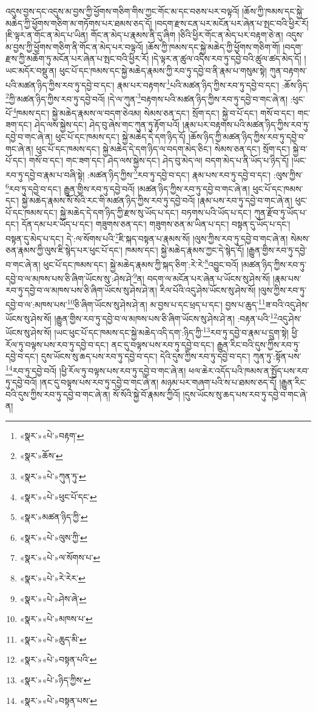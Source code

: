 འདུས་བྱས་དང་འདུས་མ་བྱས་ཀྱི་ཕྱོགས་གཅིག་གིས་ཀྱང་གོང་མ་དང་བཅས་པར་བལྟའོ། །ཆོས་ཀྱི་ཁམས་དང་སྐྱེ་མཆེད་ཀྱི་ཕྱོགས་གཅིག་མ་གཏོགས་པར་ཐམས་ཅད་དོ། །བདག་རྫས་ངན་པར་མངོན་པར་ཞེན་པ་སྤང་བའི་ཕྱིར་རོ། །ཇི་ལྟར་ན་གོང་ན་མེད་པ་ཡིན། གོང་ན་མེད་པ་རྣམས་ནི་དུ་ཞིག །ཅིའི་ཕྱིར་གོང་ན་མེད་པར་བརྟག་ཅེ་ན། འདུས་མ་བྱས་ཀྱི་ཕྱོགས་གཅིག་ནི་གོང་ན་མེད་པར་བལྟའོ། །ཆོས་ཀྱི་ཁམས་དང་སྐྱེ་མཆེད་ཀྱི་ཕྱོགས་གཅིག་གོ། །བདག་རྫས་ཀྱི་མཆོག་ཏུ་མངོན་པར་ཞེན་པ་སྤང་བའི་ཕྱིར་རོ། །དེ་ལྟར་ན་ཚུལ་འདིས་རབ་ཏུ་དབྱེ་བའི་ཚུལ་ཚད་མེད་དོ། །ཡང་མདོར་བསྡུ་ན། ཕུང་པོ་དང་ཁམས་དང་སྐྱེ་མཆེད་རྣམས་ཀྱི་རབ་ཏུ་དབྱེ་བ་ནི་རྣམ་པ་གསུམ་སྟེ། ཀུན་བརྟགས་པའི་མཚན་ཉིད་ཀྱིས་རབ་ཏུ་དབྱེ་བ་དང་། རྣམ་པར་བརྟགས་\footnote{«སྣར་»«པེ་»བརྟག་}པའི་མཚན་ཉིད་ཀྱིས་རབ་ཏུ་དབྱེ་བ་དང་། :ཆོས་ཉིད་\footnote{«སྣར་»ཆོས་}ཀྱི་མཚན་ཉིད་ཀྱིས་རབ་ཏུ་དབྱེ་བའོ། །དེ་ལ་ཀུན་\footnote{«སྣར་»«པེ་»ཀུན་ཏུ་}བརྟགས་པའི་མཚན་ཉིད་ཀྱིས་རབ་ཏུ་དབྱེ་བ་གང་ཞེ་ན། :ཕུང་པོ་\footnote{«སྣར་»«པེ་»ཕུང་པོ་དང་}ཁམས་དང་། སྐྱེ་མཆེད་རྣམས་ལ་བདག་ཅེའམ། སེམས་ཅན་དང་། སྲོག་དང་། སྐྱེ་བ་པོ་དང་། གསོ་བ་དང་། གང་ཟག་དང་། ཤེད་ལས་སྐྱེས་དང་། ཤེད་བུ་ཞེས་གང་ཀུན་ཏུ་རྟོག་པའོ། །རྣམ་པར་བརྟགས་པའི་མཚན་ཉིད་ཀྱིས་རབ་ཏུ་དབྱེ་བ་གང་ཞེ་ན། ཕུང་པོ་དང་ཁམས་དང་། སྐྱེ་མཆེད་དེ་དག་ཉིད་དོ། །ཆོས་ཉིད་ཀྱི་མཚན་ཉིད་ཀྱིས་རབ་ཏུ་དབྱེ་བ་གང་ཞེ་ན། ཕུང་པོ་དང་ཁམས་དང་། སྐྱེ་མཆེད་དེ་དག་ཉིད་ལ་བདག་མེད་ཅིང་། སེམས་ཅན་དང་། སྲོག་དང་། སྐྱེ་བ་པོ་དང་། གསོ་བ་དང་། གང་ཟག་དང་། ཤེད་ལས་སྐྱེས་དང་། ཤེད་བུ་མེད་ལ། བདག་མེད་པ་ནི་ཡོད་པ་ཉིད་དོ། །ཡང་རབ་ཏུ་དབྱེ་བ་རྣམ་པ་བཞི་སྟེ། :མཚན་ཉིད་ཀྱིས་\footnote{«སྣར་»མཚན་ཉིད་ཀྱི་}རབ་ཏུ་དབྱེ་བ་དང་། རྣམ་པས་རབ་ཏུ་དབྱེ་བ་དང་། :ལུས་ཀྱིས་\footnote{«སྣར་»«པེ་»ལུས་ཀྱི་}རབ་ཏུ་དབྱེ་བ་དང་། རྒྱུན་གྱིས་རབ་ཏུ་དབྱེ་བའོ། །མཚན་ཉིད་ཀྱིས་རབ་ཏུ་དབྱེ་བ་གང་ཞེ་ན། ཕུང་པོ་དང་ཁམས་དང་། སྐྱེ་མཆེད་རྣམས་སོ་སོའི་རང་གི་མཚན་ཉིད་ཀྱིས་རབ་ཏུ་དབྱེ་བའོ། །རྣམ་པས་རབ་ཏུ་དབྱེ་བ་གང་ཞེ་ན། ཕུང་པོ་དང་ཁམས་དང་། སྐྱེ་མཆེད་དེ་དག་ཉིད་ཀྱི་རྫས་སུ་ཡོད་པ་དང་། བཏགས་པའི་ཡོད་པ་དང་། ཀུན་རྫོབ་ཏུ་ཡོད་པ་དང་། དོན་དམ་པར་ཡོད་པ་དང་། གཟུགས་ཅན་དང་། གཟུགས་ཅན་མ་ཡིན་པ་དང་། བསྟན་དུ་ཡོད་པ་དང་། བསྟན་དུ་མེད་པ་དང་། དེ་:ལ་སོགས་པའི་\footnote{«སྣར་»«པེ་»ལ་སོགས་པ་}ཇི་སྐད་བསྟན་པ་རྣམས་སོ། །ལུས་ཀྱིས་རབ་ཏུ་དབྱེ་བ་གང་ཞེ་ན། སེམས་ཅན་རྣམས་ཀྱི་ལུས་ཇི་སྙེད་པར་ཕུང་པོ་དང་། ཁམས་དང་། སྐྱེ་མཆེད་རྣམས་ཀྱང་དེ་སྙེད་དོ། །རྒྱུན་གྱིས་རབ་ཏུ་དབྱེ་བ་གང་ཞེ་ན། ཕུང་པོ་དང་ཁམས་དང་། སྐྱེ་མཆེད་རྣམས་ཀྱི་སྐད་ཅིག་:རེ་རེ་\footnote{«སྣར་»«པེ་»རེ་རེར་}འབྱུང་བའོ། །མཚན་ཉིད་ཀྱིས་རབ་ཏུ་དབྱེ་བ་ལ་མཁས་པས་ཅི་ཞིག་ཡོངས་སུ་:ཤེས་ཤེ་\footnote{«སྣར་»«པེ་»ཤེས་ཞེ་}ན། བདག་ལ་མངོན་པར་ཞེན་པ་ཡོངས་སུ་ཤེས་སོ། །རྣམ་པས་རབ་ཏུ་དབྱེ་བ་ལ་མཁས་པས་ཅི་ཞིག་ཡོངས་སུ་ཤེས་ཤེ་ན། རིལ་པོའི་འདུ་ཤེས་ཡོངས་སུ་ཤེས་སོ། །ལུས་ཀྱིས་རབ་ཏུ་དབྱེ་བ་ལ་:མཁས་པས་\footnote{«སྣར་»«པེ་»མཁས་པ་}ཅི་ཞིག་ཡོངས་སུ་ཤེས་ཤེ་ན། མ་བྱས་པ་དང་ཕྲད་པ་དང་། བྱས་པ་ཆུད་\footnote{«སྣར་»«པེ་»ཆུད་མི་}ཟ་བའི་འདུ་ཤེས་ཡོངས་སུ་ཤེས་སོ། །རྒྱུན་གྱིས་རབ་ཏུ་དབྱེ་བ་ལ་མཁས་པས་ཅི་ཞིག་ཡོངས་སུ་ཤེས་ཤེ་ན། :བརྟན་པའི་\footnote{«སྣར་»«པེ་»བསྟན་པའི་}འདུ་ཤེས་ཡོངས་སུ་ཤེས་སོ། །ཡང་ཕུང་པོ་དང་ཁམས་དང་སྐྱེ་མཆེད་འདི་དག་:ཉིད་ཀྱི་\footnote{«སྣར་»«པེ་»ཉིད་ཀྱིས་}རབ་ཏུ་དབྱེ་བ་རྣམ་པ་དྲུག་སྟེ། ཕྱི་རོལ་ཏུ་བལྟས་པས་རབ་ཏུ་དབྱེ་བ་དང་། ནང་དུ་བལྟས་པས་རབ་ཏུ་དབྱེ་བ་དང་། རྒྱུན་རིང་བའི་དུས་ཀྱིས་རབ་ཏུ་དབྱེ་བ་དང་། དུས་ཡོངས་སུ་ཆད་པས་རབ་ཏུ་དབྱེ་བ་དང་། དེའི་དུས་ཀྱིས་རབ་ཏུ་དབྱེ་བ་དང་། ཀུན་ཏུ་:སྟོན་པས་\footnote{«སྣར་»«པེ་»བསྟན་པས་}རབ་ཏུ་དབྱེ་བའོ། །ཕྱི་རོལ་ཏུ་བལྟས་པས་རབ་ཏུ་དབྱེ་བ་གང་ཞེ་ན། ཕལ་ཆེར་འདོད་པའི་ཁམས་ན་སྤྱོད་པས་རབ་ཏུ་དབྱེ་བའོ། །ནང་དུ་བལྟས་པས་རབ་ཏུ་དབྱེ་བ་གང་ཞེ་ན། མཉམ་པར་གཞག་པའི་ས་པ་ཐམས་ཅད་དོ། །རྒྱུན་རིང་བའི་དུས་ཀྱིས་རབ་ཏུ་དབྱེ་བ་གང་ཞེ་ན། སོ་སོའི་སྐྱེ་བོ་རྣམས་ཀྱིའོ། །དུས་ཡོངས་སུ་ཆད་པས་རབ་ཏུ་དབྱེ་བ་གང་ཞེ་ན། 